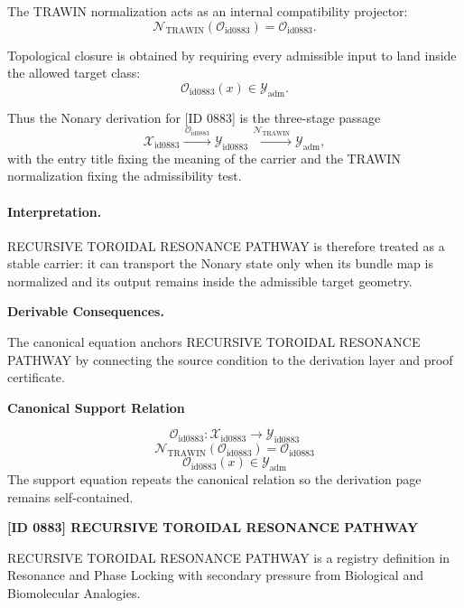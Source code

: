 The TRAWIN normalization acts as an internal compatibility projector:\[
\mathcal{N}_{\mathrm{TRAWIN}}(\mathcal{O}_{\mathrm{id0883}})=\mathcal{O}_{\mathrm{id0883}}.
\]

Topological closure is obtained by requiring every admissible input to land inside the allowed target class:\[
\mathcal{O}_{\mathrm{id0883}}(x)\in\mathcal{Y}_{\mathrm{adm}}.
\]

Thus the Nonary derivation for [ID 0883] is the three-stage passage
\[
\mathcal{X}_{\mathrm{id0883}}\xrightarrow{\,\mathcal{O}_{\mathrm{id0883}}\,} \mathcal{Y}_{\mathrm{id0883}}\xrightarrow{\,\mathcal{N}_{\mathrm{TRAWIN}}\,} \mathcal{Y}_{\mathrm{adm}},
\]
with the entry title fixing the meaning of the carrier and the TRAWIN normalization fixing the admissibility test.

\paragraph{Interpretation.} RECURSIVE TOROIDAL RESONANCE PATHWAY is therefore treated as a stable carrier: it can transport the Nonary state only when its bundle map is normalized and its output remains inside the admissible target geometry.

\par\vspace{0.35em}
\noindent\textbf{Derivable Consequences.}\quad
\begingroup
\footnotesize
\raggedright
The canonical equation anchors RECURSIVE TOROIDAL RESONANCE PATHWAY by connecting the source condition to the derivation layer and proof certificate.
\par\endgroup

\noindent\textbf{Canonical Support Relation}\par
\[
\mathcal{O}_{\mathrm{id0883}}:\mathcal{X}_{\mathrm{id0883}}\longrightarrow\mathcal{Y}_{\mathrm{id0883}}
\]
\[
\mathcal{N}_{\mathrm{TRAWIN}}(\mathcal{O}_{\mathrm{id0883}})=\mathcal{O}_{\mathrm{id0883}}
\]
\[
\mathcal{O}_{\mathrm{id0883}}(x)\in\mathcal{Y}_{\mathrm{adm}}
\]
\noindent The support equation repeats the canonical relation so the derivation page remains self-contained.\par

\clearpage
\noindent\textbf{[ID 0883] RECURSIVE TOROIDAL RESONANCE PATHWAY}\par
\vspace{0.35em}
\begingroup\small
{}
RECURSIVE TOROIDAL RESONANCE PATHWAY is a registry definition in Resonance and Phase Locking with secondary pressure from Biological and Biomolecular Analogies.

